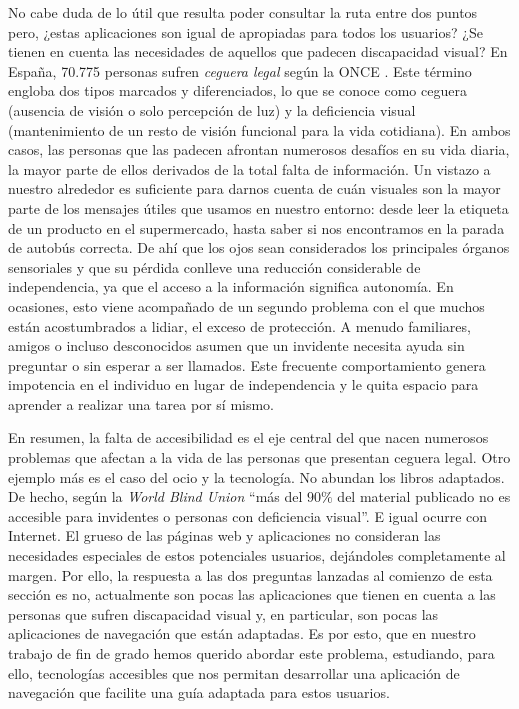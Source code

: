 No cabe duda de lo útil que resulta poder consultar la ruta entre dos puntos pero, ¿estas aplicaciones son igual de apropiadas para todos los usuarios? ¿Se tienen en cuenta las necesidades de aquellos que padecen discapacidad visual? En España, 70.775 personas sufren \textit{ceguera legal} según la ONCE \citep{informeceguera}. Este término engloba dos tipos marcados y diferenciados, lo que se conoce como ceguera (ausencia de visión o solo percepción de luz) y la deficiencia visual (mantenimiento de un resto de visión funcional para la vida cotidiana). En ambos casos, las personas que las padecen afrontan numerosos desafíos en su vida diaria, la mayor parte de ellos derivados de la total falta de información. Un vistazo a nuestro alrededor es suficiente para darnos cuenta de cuán visuales son la mayor parte de los mensajes útiles que usamos en nuestro entorno: desde leer la etiqueta de un producto en el supermercado, hasta saber si nos encontramos en la parada de autobús correcta. De ahí que los ojos sean considerados los principales órganos sensoriales y que su pérdida conlleve una reducción considerable de independencia, ya que el acceso a la información significa autonomía. En ocasiones, esto viene acompañado de un segundo problema con el que muchos están acostumbrados a lidiar, el exceso de protección. A menudo familiares, amigos o incluso desconocidos asumen que un invidente necesita ayuda sin preguntar o sin esperar a ser llamados. Este frecuente comportamiento genera impotencia en el individuo en lugar de independencia y le quita espacio para aprender a realizar una tarea por sí mismo. 

En resumen, la falta de accesibilidad es el eje central del que nacen numerosos problemas que afectan a la vida de las personas que presentan ceguera legal. Otro ejemplo más es el caso del ocio y la tecnología. No abundan los libros adaptados. De hecho, según la \textit{ World Blind Union} ``más del $90\%$ del material publicado no es accesible para invidentes o personas con deficiencia visual''\citep{envision}. E igual ocurre con Internet. El grueso de las páginas web y aplicaciones no consideran las necesidades especiales de estos potenciales usuarios, dejándoles completamente al margen. Por ello, la respuesta a las dos preguntas lanzadas al comienzo de esta sección es no, actualmente son pocas las aplicaciones que tienen en cuenta a las personas que sufren discapacidad visual y, en particular, son pocas las aplicaciones de navegación que están adaptadas. Es por esto, que en nuestro trabajo de fin de grado hemos querido abordar este problema, estudiando, para ello, tecnologías accesibles que nos permitan desarrollar una aplicación de navegación que facilite una guía adaptada para estos usuarios.

